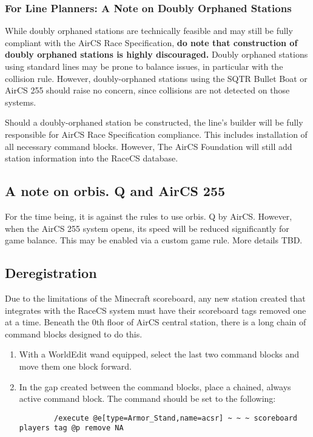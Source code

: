 \documentclass{article}
\begin{document}
\subsubsection{For Line Planners: A Note on Doubly Orphaned Stations}
While doubly orphaned stations are technically feasible and may still be fully compliant with the AirCS Race Specification, \textbf{do note that construction of doubly orphaned stations is highly discouraged.} Doubly orphaned stations using standard lines may be prone to balance issues, in particular with the collision rule. However, doubly-orphaned stations using the SQTR Bullet Boat or AirCS 255 should raise no concern, since collisions are not detected on those systems.

Should a doubly-orphaned station be constructed, the line's builder will be fully responsible for AirCS Race Specification compliance. This includes installation of all necessary command blocks. However, The AirCS Foundation will still add station information into the RaceCS database.

\subsection{A note on orbis. Q and AirCS 255}
For the time being, it is against the rules to use orbis. Q by AirCS. However, when the AirCS 255 system opens, its speed will be reduced significantly for game balance. This may be enabled via a custom game rule. More details TBD.

\subsection{Deregistration}
Due to the limitations of the Minecraft scoreboard, any new station created that integrates with the RaceCS system must have their scoreboard tags removed one at a time. Beneath the 0th floor of AirCS central station, there is a long chain of command blocks designed to do this. 
\begin{enumerate}
    \item With a WorldEdit wand equipped, select the last two command blocks and move them one block forward.
    \item In the gap created between the command blocks, place a chained, always active command block. The command should be set to the following:
    \begin{lstlisting}
        /execute @e[type=Armor_Stand,name=acsr] ~ ~ ~ scoreboard players tag @p remove NA
    \end{lstlisting}
\end{enumerate}
\end{document}
